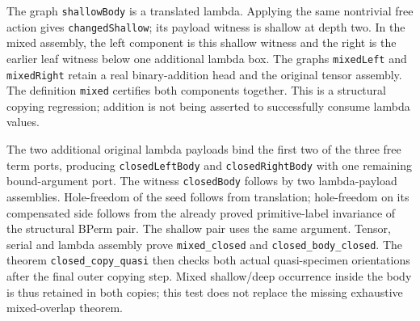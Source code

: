 
The graph \texttt{shallowBody} is a translated lambda. Applying the same
nontrivial free action gives \texttt{changedShallow}; its payload witness
is shallow at depth two. In the mixed assembly, the left component is this shallow witness and the
right is the earlier leaf witness below one additional lambda box. The graphs
\texttt{mixedLeft} and \texttt{mixedRight} retain a real binary-addition head
and the original tensor assembly. The definition \texttt{mixed} certifies both
components together. This is a structural copying regression; addition is
not being asserted to successfully consume lambda values.


The two additional original lambda payloads bind the first two of the three
free term ports, producing \texttt{closedLeftBody} and
\texttt{closedRightBody} with one remaining bound-argument port. The witness
\texttt{closedBody} follows by two lambda-payload assemblies. Hole-freedom of
the seed follows from translation; hole-freedom on its compensated side follows
from the already proved primitive-label invariance of the structural BPerm
pair. The shallow pair uses the same argument. Tensor, serial and lambda
assembly prove \texttt{mixed\_closed} and \texttt{closed\_body\_closed}.
The theorem \texttt{closed\_copy\_quasi} then checks both actual quasi-specimen
orientations after the final outer copying step. Mixed shallow/deep occurrence
inside the body is thus retained in both copies; this test does not replace
the missing exhaustive mixed-overlap theorem.

